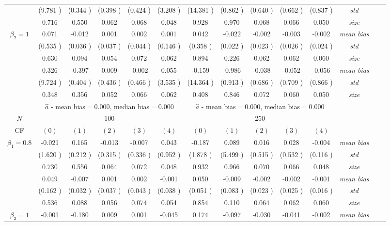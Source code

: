 \begin{table}
\begin{threeparttable}
{\begin{tabular}{|c|c|c|c|c|c|c|c|c|c|c|c|c|c|}
&(9.781 )&(0.344 )&(0.398 )&(0.424 )&(3.208 )&(14.381 )&(0.862 )&(0.640 )&(0.662 )&(0.837 )&\textit{std}\\ 
& 0.716 & 0.550 &0.062 &0.068 &0.048 &0.928& 0.970 &0.068 &0.066& 0.050 &\textit{size} \\ \midrule 
\multirow{4}{*}{$\beta_2=1$}& 0.071 & -0.012 &0.001 &0.002 &0.001 &0.042& -0.022 &-0.002 &-0.003& -0.002 &\textit{mean bias} \\ 
&(0.535 )&(0.036 )&(0.037 )&(0.044 )&(0.146 )&(0.358 )&(0.022 )&(0.023 )&(0.026 )&(0.024 )&\textit{std}\\ 
& 0.630 & 0.094 &0.054 &0.072 &0.062 &0.894& 0.226 &0.062& 0.062 &0.060 &\textit{size} \\\midrule 
\multirow{4}{*}{$\beta_3=1$}& 0.326 & -0.397 &0.009& -0.002 &0.055 &-0.159 &-0.986 &-0.038 &-0.052& -0.056 &\textit{mean bias} \\ 
&(9.724 )&(0.404 )&(0.436 )&(0.466 )&(3.535 )&(14.364 )&(0.913 )&(0.686 )&(0.709 )&(0.866 )&\textit{std}\\ 
& 0.348 & 0.356 &0.052 &0.066 &0.062 &0.408& 0.846& 0.072 &0.060 &0.050 &\textit{size} \\\midrule 
&\multicolumn{5}{|c|}{$\hat{a}$ - mean bias$=$0.000, median bias$=$0.000 }&\multicolumn{5}{|c|}{$\hat{a}$ - mean bias$=$0.000, median bias$=$0.000 }&\\ \hline 
\cellcolor{yellow}$N$&\multicolumn{5}{|c|}{\cellcolor{yellow}$100$}&\multicolumn{5}{|c|}{\cellcolor{yellow}$250$}&\\\hline 
CF&$(0)$&$(1)$&$(2)$&$(3)$&$(4)$& $(0)$ &$(1)$&$(2)$&$(3)$&$(4)$&\\\hline 
\multirow{4}{*}{$\beta_1=0.8$}& -0.021 & 0.165 &-0.013 &-0.007 &0.043 &-0.187& 0.089 &0.016 &0.028& -0.004 &\textit{mean bias} \\ 
&(1.620 )&(0.212 )&(0.315 )&(0.336 )&(0.952 )&(1.878 )&(5.499 )&(0.515 )&(0.532 )&(0.116 )&\textit{std}\\ 
& 0.730 & 0.556 &0.064 &0.072 &0.048 &0.932& 0.966 &0.070 &0.066& 0.048 &\textit{size} \\\midrule 
\multirow{4}{*}{$\beta_2=1$}& 0.049 & -0.007 &0.001 &0.002 &-0.001 &0.050& -0.009 &-0.002 &-0.002& -0.001 &\textit{mean bias} \\ 
&(0.162 )&(0.032 )&(0.037 )&(0.043 )&(0.038 )&(0.051 )&(0.083 )&(0.023 )&(0.025 )&(0.016 )&\textit{std}\\ 
& 0.536 & 0.088 &0.056 &0.074 &0.054 &0.854& 0.110 &0.064& 0.062 &0.060 &\textit{size} \\ \midrule
\multirow{4}{*}{$\beta_3=1$}& -0.001 & -0.180 &0.009& 0.001 &-0.045 &0.174 &-0.097 &-0.030 &-0.041& -0.002 &\textit{mean bias} \\ 

\end{tabular}}
\end{threeparttable}
\end{table}
